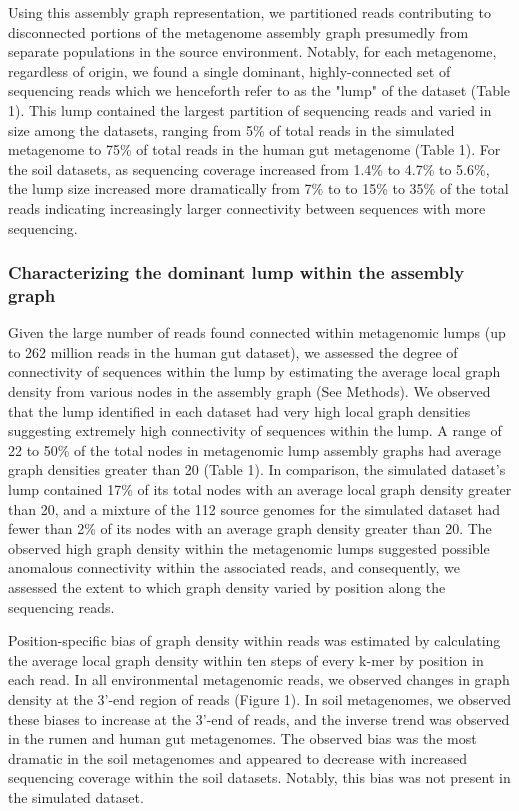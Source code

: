 \documentclass[11pt]{article} %
\begin{document}
Using this assembly graph representation, we partitioned reads contributing to disconnected portions of the metagenome assembly graph presumedly from separate populations in the source environment.  Notably, for each metagenome, regardless of origin, we found a single dominant, highly-connected set of sequencing reads which we henceforth refer to as the  "lump"  of the dataset (Table 1).  This lump contained the largest partition of sequencing reads and varied in size among the datasets, ranging from 5\% of total reads in the simulated metagenome to 75\% of total reads in the human gut metagenome (Table 1).  For the soil datasets, as sequencing coverage increased from 1.4\% to 4.7\% to 5.6\%, the lump size increased more dramatically from 7\% to to 15\% to 35\% of the total reads indicating increasingly larger connectivity between sequences with more sequencing.

\subsubsection{Characterizing the dominant lump within the assembly graph}

Given the large number of reads found connected within metagenomic lumps (up to 262 million reads in the human gut dataset), we assessed the degree of connectivity of sequences within the lump by estimating the average local graph density from various nodes in the assembly graph (See Methods).  We observed that the lump identified in each dataset had very high local graph densities suggesting extremely high connectivity of sequences within the lump.  A range of 22 to 50\% of the total nodes in metagenomic lump assembly graphs had average graph densities greater than 20 (Table 1).  In comparison, the simulated dataset's lump contained 17\% of its total nodes with an average local graph density greater than 20, and a mixture of the 112 source genomes for the simulated dataset had fewer than 2\% of its nodes with an average graph density greater than 20.  The observed high graph density within the metagenomic lumps suggested possible anomalous connectivity within the associated reads, and consequently, we assessed the extent to which graph density varied by position along the sequencing reads.  

Position-specific bias of graph density within reads was estimated by calculating the average local graph density within ten steps of every k-mer by position in each read.  In all environmental metagenomic reads, we observed changes in graph density at the 3'-end region of reads (Figure 1).  In soil metagenomes, we observed these biases to increase at the 3'-end of reads, and the inverse trend was observed in the rumen and human gut metagenomes.  The observed bias was the most dramatic in the soil metagenomes and appeared to decrease with increased sequencing coverage within the soil datasets.  Notably, this bias was not present in the simulated dataset.  
\end{document}
